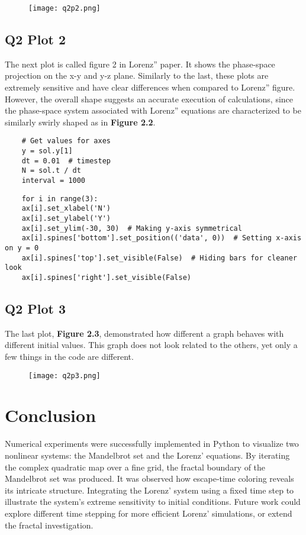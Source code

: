 \documentclass[9pt,a4paper,twocolumn,twoside]{tau-class/tau}
\begin{document}
\begin{figure}[h]
     \centering
     \texttt{[image: q2p2.png]}
 \end{figure}


\subsection{Q2 Plot 2}
The next plot is called figure 2 in Lorenz'' paper. It shows the phase-space projection on the x-y and y-z plane. Similarly to the last, these plots are extremely sensitive and have clear differences when compared to Lorenz'' figure. However, the overall shape suggests an accurate execution of calculations, since the phase-space system associated with Lorenz'' equations are characterized to be similarly swirly shaped as in \textbf{Figure 2.2}. 
   
    \lstset{language=Python, t to N conversion}
    \begin{lstlisting}
    # Get values for axes 
    y = sol.y[1]  
    dt = 0.01  # timestep 
    N = sol.t / dt  
    interval = 1000
\end{lstlisting}
  
    \lstset{language=Python, caption = Mass Labeling}
    \begin{lstlisting}
    for i in range(3):  
    ax[i].set_xlabel('N')  
    ax[i].set_ylabel('Y')
    ax[i].set_ylim(-30, 30)  # Making y-axis symmetrical
    ax[i].spines['bottom'].set_position(('data', 0))  # Setting x-axis on y = 0
    ax[i].spines['top'].set_visible(False)  # Hiding bars for cleaner look
    ax[i].spines['right'].set_visible(False)
\end{lstlisting}

\subsection{Q2 Plot 3}
The last plot, \textbf{Figure 2.3}, demonstrated how different a graph behaves with different initial values. This graph does not look related to the others, yet only a few things in the code are different. 

\begin{figure}[h]
    \centering
    \texttt{[image: q2p3.png]}
\end{figure}

\section{Conclusion}
Numerical experiments were successfully implemented in Python to visualize two nonlinear systems: the Mandelbrot set and the Lorenz' equations. By iterating the complex quadratic map over a fine grid, the fractal boundary of the Mandelbrot set was produced. It was observed how escape‐time coloring reveals its intricate structure. Integrating the Lorenz' system using a fixed time step to illustrate the system’s extreme sensitivity to initial conditions.  Future work could explore different time stepping for more efficient Lorenz' simulations, or extend the fractal investigation. 


\printbibliography

\end{document}
